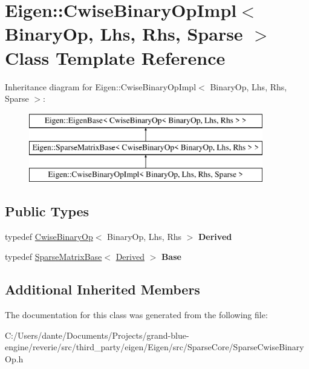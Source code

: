 \hypertarget{class_eigen_1_1_cwise_binary_op_impl_3_01_binary_op_00_01_lhs_00_01_rhs_00_01_sparse_01_4}{}\section{Eigen\+::Cwise\+Binary\+Op\+Impl$<$ Binary\+Op, Lhs, Rhs, Sparse $>$ Class Template Reference}
\label{class_eigen_1_1_cwise_binary_op_impl_3_01_binary_op_00_01_lhs_00_01_rhs_00_01_sparse_01_4}
Inheritance diagram for Eigen\+::Cwise\+Binary\+Op\+Impl$<$ Binary\+Op, Lhs, Rhs, Sparse $>$\+:\begin{figure}[H]
\begin{center}
\leavevmode
\includegraphics[height=3.000000cm]{class_eigen_1_1_cwise_binary_op_impl_3_01_binary_op_00_01_lhs_00_01_rhs_00_01_sparse_01_4}
\end{center}
\end{figure}
\subsection*{Public Types}
\begin{DoxyCompactItemize}
\item 
\mbox{\label{class_eigen_1_1_cwise_binary_op_impl_3_01_binary_op_00_01_lhs_00_01_rhs_00_01_sparse_01_4_a3d5deb540c9c642dbe4fe63e8e320f20}} 
typedef \mbox{\hyperlink{class_eigen_1_1_cwise_binary_op}{Cwise\+Binary\+Op}}$<$ Binary\+Op, Lhs, Rhs $>$ {\bfseries Derived}
\item 
\mbox{\label{class_eigen_1_1_cwise_binary_op_impl_3_01_binary_op_00_01_lhs_00_01_rhs_00_01_sparse_01_4_aada7e73dfed941e90490e5ea3e1de602}} 
typedef \mbox{\hyperlink{class_eigen_1_1_sparse_matrix_base}{Sparse\+Matrix\+Base}}$<$ \mbox{\hyperlink{class_eigen_1_1_cwise_binary_op}{Derived}} $>$ {\bfseries Base}
\end{DoxyCompactItemize}
\subsection*{Additional Inherited Members}


The documentation for this class was generated from the following file\+:\begin{DoxyCompactItemize}
\item 
C\+:/\+Users/dante/\+Documents/\+Projects/grand-\/blue-\/engine/reverie/src/third\+\_\+party/eigen/\+Eigen/src/\+Sparse\+Core/Sparse\+Cwise\+Binary\+Op.\+h\end{DoxyCompactItemize}
